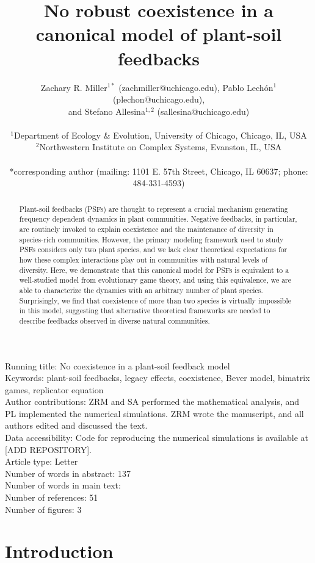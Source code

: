 \documentclass[11pt]{article}
\title{No robust coexistence in a canonical model of plant-soil feedbacks}
\date{}
\author{Zachary R. Miller$^{1*}$ (zachmiller@uchicago.edu), Pablo Lech\'{o}n$^{1}$ (plechon@uchicago.edu),\\ and Stefano Allesina$^{1,2}$ (sallesina@uchicago.edu) \\
	\\
	\normalsize{$^{1}$Department of Ecology \& Evolution, University of Chicago, Chicago, IL, USA}\\
	\normalsize{$^{2}$Northwestern Institute on Complex Systems, Evanston, IL, USA}\\
	\\
	\normalsize{*corresponding author (mailing: 1101 E. 57th Street, Chicago, IL 60637; phone: 484-331-4593)}\\
}
\begin{document}
	
\maketitle
{}

\noindent Running title: No coexistence in a plant-soil feedback model\\
Keywords: plant-soil feedbacks, legacy effects, coexistence, Bever model, bimatrix games, replicator equation \\

\noindent Author contributions: ZRM and SA performed the mathematical analysis, and PL implemented the numerical simulations. ZRM wrote the manuscript, and all authors edited and discussed the text. \\

\noindent Data accessibility: Code for reproducing the numerical simulations is available at [ADD REPOSITORY].\\

\noindent Article type: Letter\\
Number of words in abstract: 137\\
Number of words in main text: \\
Number of references: 51 \\
Number of figures: 3

\linenumbers

\begin{abstract}
Plant-soil feedbacks (PSFs) are thought to represent a crucial mechanism generating frequency dependent dynamics in plant communities. Negative feedbacks, in particular, are routinely invoked to explain coexistence and the maintenance of diversity in species-rich communities. However, the primary modeling framework used to study PSFs considers only two plant species, and we lack clear theoretical expectations for how these complex interactions play out in communities with natural levels of diversity. Here, we demonstrate that this canonical model for PSFs is equivalent to a well-studied model from evolutionary game theory, and using this equivalence, we are able to characterize the dynamics with an arbitrary number of plant species. Surprisingly, we find that coexistence of more than two species is virtually impossible in this model, suggesting that alternative theoretical frameworks are needed to describe feedbacks observed in diverse natural communities. 
\end{abstract}

\section{Introduction}
\end{document}
